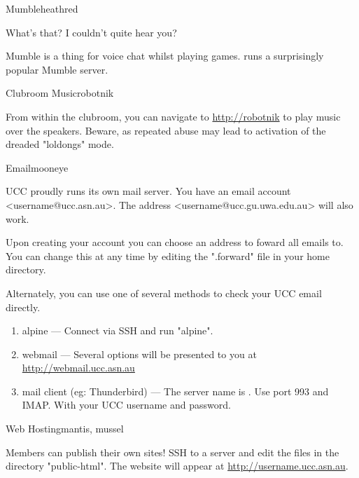 \pagebreak

\begin{uccservice}{Mumble}{heathred}

What's that? I couldn't quite hear you?

Mumble is a thing for voice chat whilst playing games.  runs a surprisingly popular Mumble server.

\end{uccservice}

\begin{uccservice}{Clubroom Music}{robotnik}

From within the clubroom, you can navigate to \url{http://robotnik} to play music over the speakers. Beware, as repeated abuse may lead to activation of the dreaded "loldongs" mode.

\end{uccservice}

\begin{uccservice}{Email}{mooneye}

UCC proudly runs its own mail server. You have an email account <username@ucc.asn.au>. The address <username@ucc.gu.uwa.edu.au> will also work.

Upon creating your account you can choose an address to foward all emails to. You can change this at any time by editing the ".forward" file in your home directory.

Alternately, you can use one of several methods to check your UCC email directly.
\begin{enumerate}
	\item alpine --- Connect via SSH and run "alpine".
	\item webmail --- Several options will be presented to you at \url{http://webmail.ucc.asn.au}
	\item mail client (eg: Thunderbird) --- The server name is . Use port 993 and IMAP. With your UCC username and password.
\end{enumerate}

\end{uccservice}

\begin{uccservice}{Web Hosting}{mantis, mussel}

Members can publish their own sites! SSH to a server and edit the files in the directory "public-html". The website will appear at \url{http://username.ucc.asn.au}.

\end{uccservice}

